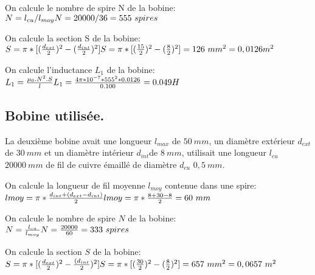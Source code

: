 On calcule le nombre de spire N de la bobine: \\
\begin{math}
	N=l_{cu}/l_{moy} \\
	N= 20000/36 = 555\ spires
\end{math}

On calcule la section S de la bobine: \\
\begin{math}
	S= \pi*[(\frac{d_{ext}}{2})^2 - (\frac{d_{int}}{2})^2] \\
	S= \pi*[(\frac{15}{2})^2 - (\frac{8}{2})^2] = 126\ mm^2 = 0,0126 m^2
\end{math}

On calcule l'inductance $L_{1}$ de la bobine: \\
\begin{math}
	L_{1} = \frac{\mu_0.N^2.S}{l} \\
	L_{1} = \frac{4\pi*10^{-7}*555^2*0.0126}{0.100}=0.049 H
\end{math}

\subsection{Bobine utilisée.}
La deuxième bobine avait une longueur $l_{max}$ de $50\ mm$, un
diamètre   extérieur $d_{ext}$ de $30\ mm$ et un diamètre intérieur
$d_{int}$de $8\ mm$,   utilisait une longueur $l_{cu}$ $20000\ mm$ de fil
de cuivre émaillé de   diamètre $d_{cu}$ $0,5\ mm$.

On calcule la longueur de fil moyenne $l_{moy}$ contenue dans une
spire: \\
\begin{math}
	l{moy}= \pi*\frac{d_{int}+(d_{ext}-d_{int})}{2} \\
	l{moy}= \pi*\frac{8+30-8}{2}= 60\ mm
\end{math}

On calcule le nombre de spire $N$ de la bobine: \\
\begin{math}
	N = \frac{l_{cu}}{l_{moy}} \\
	N = \frac{20000}{60} = 333\ spires
\end{math}

On calcule la section $S$ de la bobine: \\
\begin{math}
	S = \pi*[(\frac{d_{ext}}{2})^2 - \frac{(d_{int}}{2})^2] \\
	S = \pi*[(\frac{30}{2})^2 -(\frac{8}{2})^2] = 657\ mm^2 = 0,0657\ m^2
\end{math}


